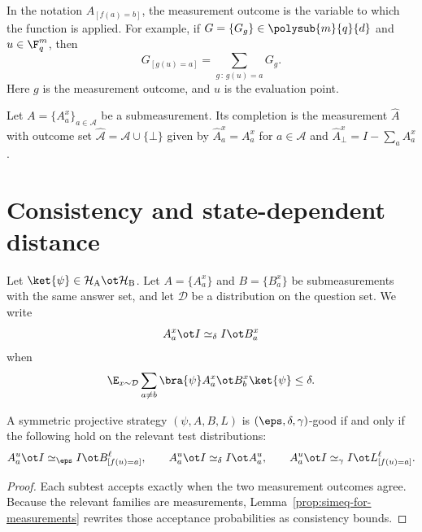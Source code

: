 \begin{remark}\label{rem:post-processing-notation}
	In the notation $A_{[f(a)=b]}$, the measurement outcome is the variable to which
	the function is applied. For example, if $G=\{G_g\} \in \polysub{m}{q}{d}$ and
	$u \in \F_q^m$, then
	\[
		G_{[g(u)=a]} = \sum_{g\,:\,g(u)=a} G_g.
	\]
	Here $g$ is the measurement outcome, and $u$ is the evaluation point.
\end{remark}

\begin{definition}\label{def:measurement-completion}
	\leanok
	Let $A=\{A_a^x\}_{a \in \mathcal A}$ be a submeasurement. Its completion is the measurement $\widehat A$ with outcome set $\widehat{\mathcal A}=\mathcal A \cup \{\bot\}$ given by $\widehat A_a^x=A_a^x$ for $a \in \mathcal A$ and $\widehat A_\bot^x = I-\sum_a A_a^x$.
\end{definition}

\section{Consistency and state-dependent distance}
\label{sec:comparing-measurements}


\begin{definition}[Consistency]\label{def:simeq}
	\leanok
	Let $\ket{\psi} \in \mathcal H_{\mathrm A} \ot \mathcal H_{\mathrm B}$. Let $A=\{A_a^x\}$ and $B=\{B_a^x\}$ be submeasurements with the same answer set, and let $\mathcal D$ be a distribution on the question set. We write
	\[
		A_a^x \ot I \simeq_\delta I \ot B_a^x
	\]
	when
	\begin{equation}\label{eq:no-big-Oh}
		\E_{x \sim \mathcal D} \sum_{a \ne b} \bra{\psi} A_a^x \ot B_b^x \ket{\psi} \le \delta.
	\end{equation}
\end{definition}

\begin{lemma}\label{lem:good-strategy-characterization}
	\leanok
	A symmetric projective strategy $(\psi,A,B,L)$ is $(\eps,\delta,\gamma)$-good if and only if the following hold on the relevant test distributions:
	\[
		A_a^u \ot I \simeq_\eps I \ot B^{\ell}_{[f(u)=a]},
		\qquad
		A_a^u \ot I \simeq_\delta I \ot A_a^u,
		\qquad
		A_a^u \ot I \simeq_\gamma I \ot L^{\ell}_{[f(u)=a]}.
	\]
\end{lemma}
\begin{proof}
	\leanok
	Each subtest accepts exactly when the two measurement outcomes agree. Because the relevant families are measurements, Lemma~\ref{prop:simeq-for-measurements} rewrites those acceptance probabilities as consistency bounds.
\end{proof}

